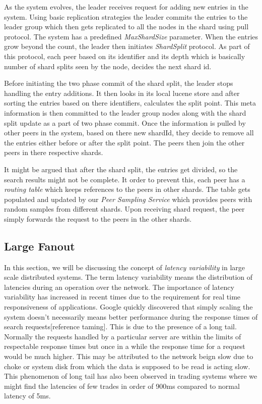 \documentclass[12pt,a4paper,twoside,openright]{book}
\begin{document}
As the system evolves, the leader receives request for adding new entries in the system. Using basic replication strategies the leader commits the entries to the leader group which then gets replicated to all the nodes in the shard using pull protocol. The system has a predefined \textit{MaxShardSize} parameter. When the entries grow beyond the count, the leader then initiates \textit{ShardSplit} protocol. As part of this protocol, each peer based on its identifier and its depth which is basically number of shard splits seen by the node, decides the next shard id. 
\par Before initiating the two phase commit of the shard split, the leader stops handling the entry additions. It then looks in its local lucene store and after sorting the entries based on there identifiers, calculates the split point. This meta information is then committed to the leader group nodes along with the shard split update as a part of two phase commit. Once the information is pulled by other peers in the system, based on there new shardId, they decide to remove all the entries either before or after the split point. The peers then join the other peers in there respective shards. 
\par It might be argued that after the shard split, the entries get divided, so the search results might not be complete. It order to prevent this, each peer has a \textit{routing table} which keeps references to the peers in other shards. The table gets populated and updated by our \textit{Peer Sampling Service} which provides peers with random samples from different shards. Upon receiving shard request, the peer simply forwards the request to the peers in the other shards.


\subsection{Large Fanout}
In this section, we will be discussing the concept of \textit{latency variability} in large scale distributed systems. The term latency variability means the distribution of latencies during an operation over the network. The importance of latency variability has increased in recent times due to the requirement for real time responsiveness of applications. Google quickly discovered that simply scaling the system doesn't necessarily means better performance during the response times of search requests[reference taming]. This is due to the presence of a long tail. Normally the requests handled by a particular server are within the limits of respectable response times but once in a while the response time for a request would be much higher. This may be attributed to the network beign slow due to choke or system disk from which the data is supposed to be read is acting slow. This phenomenon of long tail has also been observed in trading systems where we might find the latencies of few trades in order of 900ms compared to normal latency of 5ms. 
\end{document}
